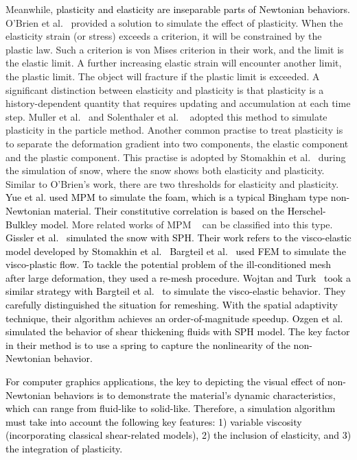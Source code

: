 \documentclass[10pt,journal,compsoc]{IEEEtran}
\newcommand{\revised}[1]{{\textcolor{black}{#1}}}
\begin{document}
Meanwhile, \revised{plasticity and elasticity are inseparable parts of Newtonian behaviors.} O'Brien et al.~\cite {OBrien2002} provided a solution to simulate the effect of plasticity. When the elasticity strain (or stress) exceeds a criterion, it will be constrained by the plastic law. Such a criterion is von Mises criterion in their work, and the limit is the elastic limit. A further increasing elastic strain will encounter another limit, the plastic limit. The object will fracture if the plastic limit is exceeded. A significant distinction between elasticity and plasticity is that plasticity is a history-dependent quantity that requires updating and accumulation at each time step. Muller et al.~\cite{Muller2004-elastic-plastic-melting} and Solenthaler et al. ~\cite{Solenthaler2007} adopted this method to simulate plasticity in the particle method. Another common practise to treat plasticity is to separate the deformation gradient into two components, the elastic component and the plastic component. This practise is adopted by Stomakhin et al.~\cite{Stomakhin2013-snow} during the simulation of snow, where the snow shows both elasticity and plasticity. Similar to O'Brien's work, there are two thresholds for elasticity and plasticity. \revised{Yue et al.\cite{Yue2015} used MPM to simulate the foam, which is a typical Bingham type non-Newtonian material. Their constitutive correlation is based on the Herschel-Bulkley model.} More related works of MPM ~\cite{Su2021,gao2019efficient,Fang2019-sillyRubber,Gao2018-GPU-MPM} can be classified into this type. \revised{Gissler et al.~\cite{Gissler2020-snow} simulated the snow with SPH. Their work refers to the visco-elastic model developed by Stomakhin et al.~\cite{Stomakhin2014}} \revised{Bargteil et al.~\cite{Bargteil-2007-AFE} used FEM to simulate the visco-plastic flow. To tackle the potential problem of the ill-conditioned mesh after large deformation, they used a re-mesh procedure.} \revised{Wojtan and Turk~\cite{Wojtan2008} took a similar strategy with Bargteil et al.~\cite{Bargteil-2007-AFE} to simulate the visco-elastic behavior. They carefully distinguished the situation for remeshing. With the spatial adaptivity technique, their algorithm achieves an order-of-magnitude speedup.} \revised{Ozgen et al.~\cite{Ozgen2019} simulated the behavior of shear thickening fluids with SPH model. The key factor in their method is to use a spring to capture the nonlinearity of the non-Newtonian behavior.}


\revised{For computer graphics applications, the key to depicting the visual effect of non-Newtonian behaviors is to demonstrate the material’s dynamic characteristics, which can range from fluid-like to solid-like. Therefore, a simulation algorithm must take into account the following key features: 1) variable viscosity (incorporating classical shear-related models), 2) the inclusion of elasticity, and 3) the integration of plasticity.}
\end{document}
